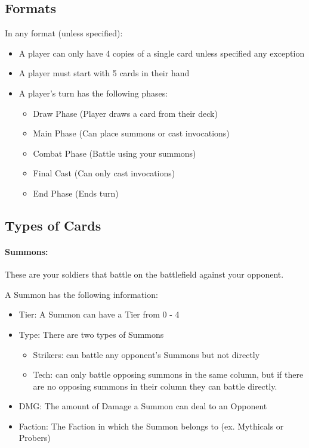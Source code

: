 \documentclass[12pt, letterpaper]{article}
\begin{document}
\subsection{Formats}
In any format (unless specified): 
\begin{itemize}
    \item A player can only have 4 copies of a single card unless specified any exception
    \item A player must start with 5 cards in their hand 
    \item A player's turn has the following phases:
     \begin{itemize}
        \item Draw Phase (Player draws a card from their deck)
        \item Main Phase (Can place summons or cast invocations)
        \item Combat Phase (Battle using your summons)
        \item Final Cast (Can only cast invocations)
        \item End Phase (Ends turn)
     \end{itemize}
\end{itemize}




\newpage
\subsection{Types of Cards}
\paragraph{Summons: \\}
\par These are your soldiers that battle on the battlefield against your opponent. 
\par A Summon has the following information: 
\begin{itemize}
    \item Tier: A Summon can have a Tier from 0 - 4
    \item Type: There are two types of Summons 
    \begin{itemize}
        \item Strikers:  can battle any opponent's Summons but not directly
        \item Tech: can only battle opposing summons in the same column, but if there are no opposing summons in their column they can battle directly.
    \end{itemize}
    \item DMG: The amount of Damage a Summon can deal to an Opponent
    \item Faction: The Faction in which the Summon belongs to (ex. Mythicals or Probers)
\end{itemize}
\end{document}
